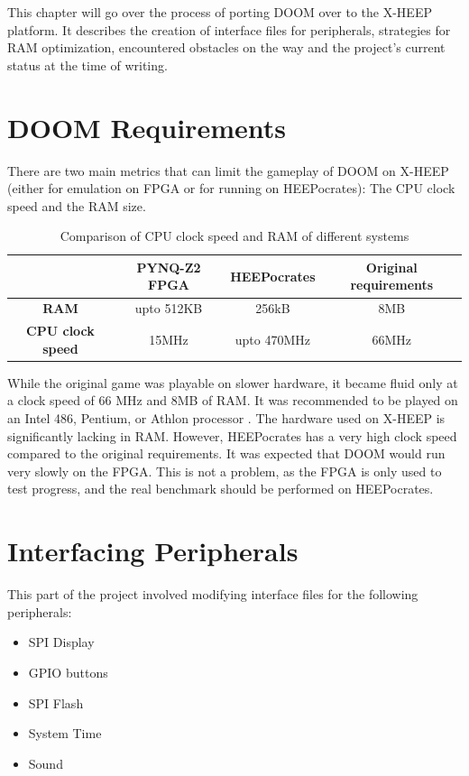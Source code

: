 This chapter will go over the process of porting DOOM over to the X-HEEP platform. It describes the creation of interface files for peripherals, strategies for RAM optimization, encountered obstacles on the way and the project's current status at the time of writing. 

\section{DOOM Requirements}
There are two main metrics that can limit the gameplay of DOOM on X-HEEP (either for emulation on FPGA or for running on HEEPocrates): The CPU clock speed and the RAM size.

\begin{table}[ht]
    \centering
    \begin{tabular}{|c|c|c|c|}
        \hline
         & \textbf{PYNQ-Z2 FPGA} & \textbf{HEEPocrates} & \textbf{Original requirements} \\
        \hline
        \textbf{RAM} & upto 512KB & 256kB & 8MB \\
        \hline
        \textbf{CPU clock speed} & 15MHz & upto 470MHz & 66MHz \\
        \hline
    \end{tabular}
    \caption{Comparison of CPU clock speed and RAM of different systems}
    \label{table:systemPerformance}
\end{table}

While the original game was playable on slower hardware, it became fluid only at a clock speed of 66 MHz and 8MB of RAM. It was recommended to be played on an Intel 486, Pentium, or Athlon processor \cite{doomSystemRequirements}. The hardware used on X-HEEP is significantly lacking in RAM. However, HEEPocrates has a very high clock speed compared to the original requirements. It was expected that DOOM would run very slowly on the FPGA. This is not a problem, as the FPGA is only used to test progress, and the real benchmark should be performed on HEEPocrates.


\section{Interfacing Peripherals}

This part of the project involved modifying interface files for the following peripherals: \\

\begin{itemize}
   \item SPI Display
   \item GPIO buttons
   \item SPI Flash
   \item System Time
   \item Sound
\end{itemize}

